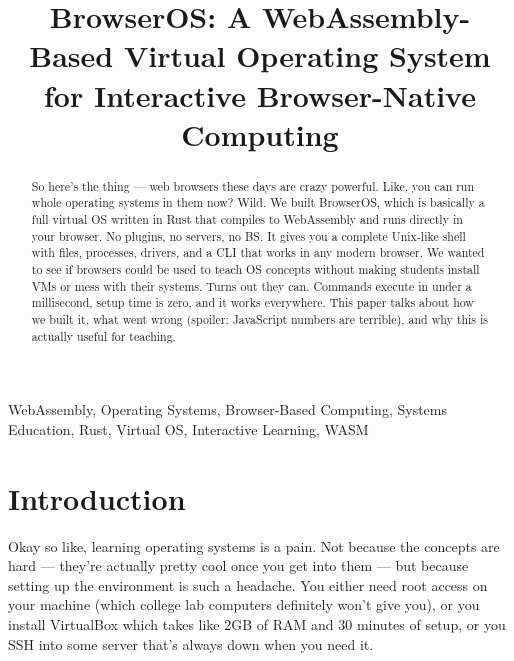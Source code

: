 \documentclass[conference]{IEEEtran}
\begin{document}
\title{BrowserOS: A WebAssembly-Based Virtual Operating System for Interactive Browser-Native Computing\\
}

\author{
}

\maketitle

\begin{abstract}
So here's the thing — web browsers these days are crazy powerful. Like, you can run whole operating systems in them now? Wild. We built BrowserOS, which is basically a full virtual OS written in Rust that compiles to WebAssembly and runs directly in your browser. No plugins, no servers, no BS. It gives you a complete Unix-like shell with files, processes, drivers, and a CLI that works in any modern browser. We wanted to see if browsers could be used to teach OS concepts without making students install VMs or mess with their systems. Turns out they can. Commands execute in under a millisecond, setup time is zero, and it works everywhere. This paper talks about how we built it, what went wrong (spoiler: JavaScript numbers are terrible), and why this is actually useful for teaching.
\end{abstract}

\begin{IEEEkeywords}
WebAssembly, Operating Systems, Browser-Based Computing, Systems Education, Rust, Virtual OS, Interactive Learning, WASM
\end{IEEEkeywords}

\section{Introduction}

Okay so like, learning operating systems is a pain. Not because the concepts are hard — they're actually pretty cool once you get into them — but because setting up the environment is such a headache. You either need root access on your machine (which college lab computers definitely won't give you), or you install VirtualBox which takes like 2GB of RAM and 30 minutes of setup, or you SSH into some server that's always down when you need it. 
\end{document}
